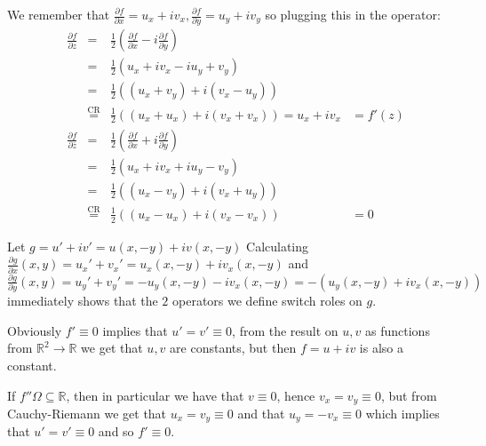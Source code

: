 \begin{cExercise}
	\begin{cPart}
		We remember that $\frac{\partial f}{\partial x}=u_x+iv_x, \frac{\partial f}{\partial y}=u_y+iv_y$ so plugging this in the operator:
		\begin{align*}
			&\frac{\partial f}{\partial z}&=&\frac12\left(\frac{\partial f}{\partial x}-i\frac{\partial f}{\partial y}\right)&\\
			&&=&\frac12\left(u_x+iv_x-iu_y+v_y\right)&\\
			&&=&\frac12\left((u_x+v_y)+i(v_x-u_y)\right)&\\
			&&\overset{\text{CR}}{=}&\frac12\left((u_x+u_x)+i(v_x+v_x)\right)=u_x+iv_x&=f'(z)\\
			&\frac{\partial f}{\partial \overline z}&=&\frac12\left(\frac{\partial f}{\partial x}+i\frac{\partial f}{\partial y}\right)&\\
			&&=&\frac12\left(u_x+iv_x+iu_y-v_y\right)&\\
			&&=&\frac12\left((u_x-v_y)+i(v_x+u_y)\right)&\\
			&&\overset{\text{CR}}{=}&\frac12\left((u_x-u_x)+i(v_x-v_x)\right)&=0
		\end{align*}
	\end{cPart}
	\begin{cPart}
		Let $g=u'+iv'=u(x,-y)+iv(x,-y)$
		Calculating $\frac{\partial g}{\partial x}(x,y)=u_x'+v_x'=u_x(x,-y)+iv_x(x,-y)$ and $\frac{\partial g}{\partial y}(x,y)=u_y'+v_y'=-u_y(x,-y)-iv_x(x,-y)=-(u_y(x,-y)+iv_x(x,-y))$ immediately shows that the $2$ operators we define switch roles on $g$.
	\end{cPart}
\end{cExercise}
\begin{cExercise}
		\begin{cPart}
		Obviously $f'\equiv 0$ implies that $u'=v'\equiv 0$, from the result on $u,v$ as functions from $\mathbb R^2\to\mathbb R$ we get that $u,v$ are constants, but then $f=u+iv$ is also a constant.
	\end{cPart}
	\begin{cPart}
		If $f''\Omega\subseteq\mathbb R$, then in particular we have that $v\equiv 0$, hence $v_x=v_y\equiv 0$, but from Cauchy-Riemann we get that $u_x=v_y\equiv 0$ and that $u_y=-v_x\equiv 0$ which implies that $u'=v'\equiv 0$ and so $f'\equiv 0$.
	\end{cPart}
\end{cExercise}
